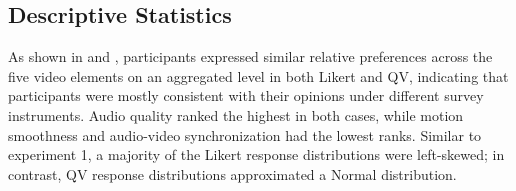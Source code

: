 \subsection{Descriptive Statistics}

As shown in  and , participants expressed similar relative preferences across the five video elements on an aggregated level in both Likert and QV, indicating that participants were mostly consistent with their opinions under different survey instruments. Audio quality ranked the highest in both cases, while motion smoothness and audio-video synchronization had the lowest ranks. Similar to experiment 1, a majority of the Likert response distributions were left-skewed; in contrast, QV response distributions approximated a Normal distribution.

